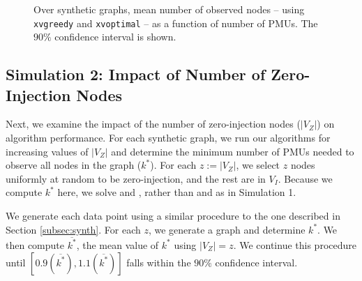 \begin{figure}[t]
\begin{center}
  \end{center}
	\caption{Over synthetic graphs, mean number of observed nodes -- using {\tt xvgreedy} and {\tt xvoptimal} -- as a function of number of PMUs. The $90\%$ confidence interval is shown.}
  \label{fig:xv-res}
\end{figure}





\subsection{Simulation 2: Impact of Number of Zero-Injection Nodes}
\label{subsec:zero}

Next, we examine the impact of the number of zero-injection nodes ($|V_Z|$) on algorithm performance. 
For each synthetic graph, we run our algorithms for increasing values of $|V_Z|$ and determine the minimum number of PMUs needed to observe all nodes in the graph ($k^*$).
For each $z:=|V_Z|$, we select $z$ nodes uniformly at random to be zero-injection, and the rest are in $V_I$. Because we compute $k^*$ here, we solve \full and \xvals, rather than
\maxinc and \xvalpart as in Simulation 1.

We generate each data point using a similar procedure to the one described in Section \ref{subsec:synth}.  
For each $z$, we generate a graph and determine $k^*$. %
We then compute $\overline{k^*}$, the mean value of $k^*$ using $|V_Z| = z$.
We continue this procedure until $[0.9(\overline{k^*}),1.1(\overline{k^*})]$ falls within the $90\%$ confidence interval.

